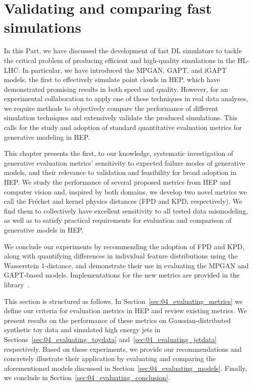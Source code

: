 \chapter{Validating and comparing fast simulations}
\label{sec:04_evaluating}


In this Part, we have discussed the development of fast DL simulators to tackle the critical problem of producing efficient and high-quality simulations in the HL-LHC.
In particular, we have introduced the MPGAN, GAPT, and iGAPT models, the first to effectively simulate point clouds in HEP, which have demonstrated promising results in both speed and quality.
However, for an experimental collaboration to apply one of these techniques in real data analyses, we require methods to objectively compare the performance of different simulation techniques and extensively validate the produced simulations. 
This calls for the study and adoption of standard quantitative evaluation metrics for generative modeling in HEP. 

This chapter presents the first, to our knowledge, systematic investigation of generative evaluation metrics' sensitivity to expected failure modes of generative models, and their relevance to validation and feasibility for broad adoption in HEP. 
We study the performance of several proposed metrics from HEP and computer vision and, inspired by both domains, we develop two novel metrics we call the Fr\'echet and kernel physics distances (FPD and KPD, respectively).
We find them to collectively have excellent sensitivity to all tested data mismodeling, as well as to satisfy practical requirements for evaluation and comparison of generative models in HEP.

We conclude our experiments by recommending the adoption of FPD and KPD, along with quantifying differences in individual feature distributions using the Wasserstein 1-distance, and demonstrate their use in evaluating the MPGAN and GAPT-based models.
Implementations for the new metrics are provided in the \jetnet library~\cite{kansal_jetnet_library}.

This section is structured as follows. 
In Section~\ref{sec:04_evaluating_metrics} we define our criteria for evaluation metrics in HEP and review existing metrics. 
We present results on the performance of these metrics on Gaussian-distributed synthetic toy data and simulated high energy jets in Sections~\ref{sec:04_evaluating_toydata} and~\ref{sec:04_evaluating_jetdata} respectively. 
Based on these experiments, we provide our recommendations and concretely illustrate their application by evaluating and comparing the aforementioned models discussed in Section~\ref{sec:04_evaluating_models}.
Finally, we conclude in Section~\ref{sec:04_evaluating_conclusion}.


